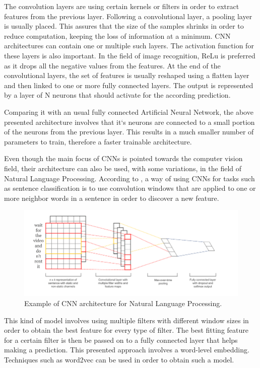 \documentclass[12pt,a4paper]{report}
\begin{document}
The convolution layers are using certain kernels or filters in order to extract features from the previous layer. Following a convolutional layer, a pooling layer is usually placed. This assures that the size of the samples shrinks in order to reduce computation, keeping the loss of information at a minimum. CNN architectures can contain one or multiple such layers. The activation function for these layers is also important. In the field of image recognition, ReLu is preferred as it drops all the negative values from the features. At the end of the convolutional layers, the set of features is usually reshaped using a flatten layer and then linked to one or more fully connected layers. The output is represented by a layer of N neurons that should activate for the according prediction.

Comparing it with an usual fully connected Artificial Neural Network, the above presented architecture involves that it`s neurons are connected to a small portion of the neurons from the previous layer. This results in a much smaller number of parameters to train, therefore a faster trainable architecture.

Even though the main focus of CNNs is pointed towards the computer vision field, their architecture can also be used, with some variations, in the field of Natural Language Processing. According to \citet{kim2014convolutional}, a way of using CNNs for tasks such as sentence classification is to use convolution windows that are applied to one or more neighbor words in a sentence in order to discover a new feature. 

\begin{figure}[H]
\centering
\includegraphics[width=15cm]{pics/cnn_nlp.png}
  \caption{Example of CNN architecture for Natural Language Processing. \citet{kim2014convolutional}}
  \label{fig:CNN_NLP}
\end{figure}

This kind of model involves using multiple filters with different window sizes in order to obtain the best feature for every type of filter. The best fitting feature for a certain filter is then be passed on to a fully connected layer that helps making a prediction. This presented approach involves a word-level embedding. Techniques such as word2vec can be used in order to obtain such a model.
\end{document}
